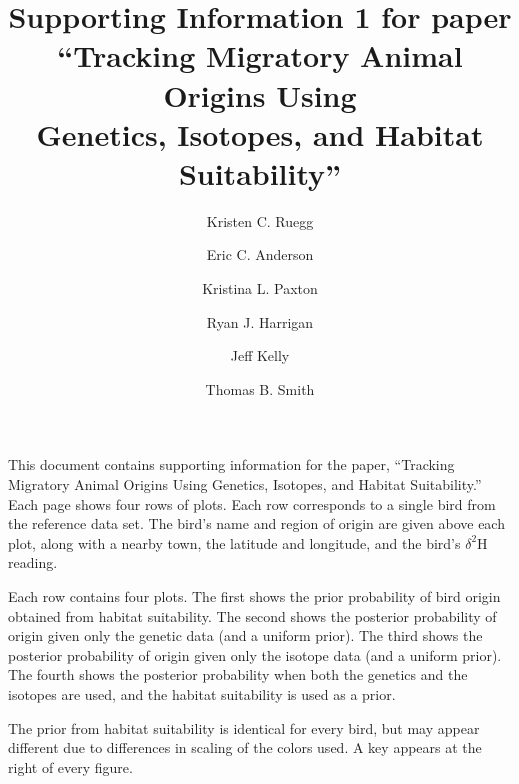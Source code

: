 \documentclass[11pt,landscape]{article}
\title{Supporting Information 1 for paper\\
``Tracking Migratory Animal Origins Using \\
Genetics, Isotopes, and Habitat Suitability''}
\author{Kristen C. Ruegg \and  
         Eric C. Anderson \and 
         Kristina L. Paxton\and 
         Ryan J. Harrigan \and
         Jeff Kelly \and
         Thomas B. Smith
         }
\begin{document}
\maketitle


This document contains supporting information for the paper, ``Tracking Migratory Animal Origins Using
Genetics, Isotopes, and Habitat Suitability.''  Each page shows four rows of plots.  Each row corresponds
to a single bird from the reference data set.  The bird's name and region of origin are given above each plot,
along with a nearby town, the latitude and longitude, and the bird's $\delta^2\mathrm{H}$ reading.  

Each row contains four plots. The first shows the prior probability of bird origin obtained from habitat suitability.
The second shows the posterior probability of origin given only the genetic data (and a uniform prior).  
The third shows the posterior probability of origin given only the isotope data (and a uniform prior).
The fourth shows
the posterior probability when both the genetics and the isotopes are used, and the habitat suitability is used as a prior.  

The prior from habitat suitability is identical for every bird, but may appear different due to differences in scaling of the 
colors used. A key appears at the right of every figure.
\newpage





 
\end{document}
